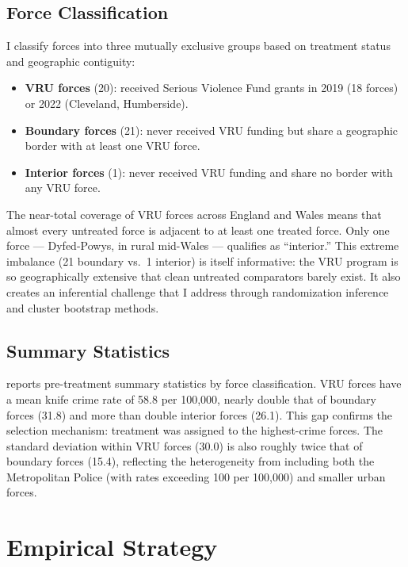\documentclass[12pt]{article}
\begin{document}
\subsection{Force Classification}

I classify forces into three mutually exclusive groups based on treatment status and geographic contiguity:

\begin{itemize}
\item \textbf{VRU forces} (20): received Serious Violence Fund grants in 2019 (18 forces) or 2022 (Cleveland, Humberside).
\item \textbf{Boundary forces} (21): never received VRU funding but share a geographic border with at least one VRU force.
\item \textbf{Interior forces} (1): never received VRU funding and share no border with any VRU force.
\end{itemize}

The near-total coverage of VRU forces across England and Wales means that almost every untreated force is adjacent to at least one treated force. Only one force --- Dyfed-Powys, in rural mid-Wales --- qualifies as ``interior.'' This extreme imbalance (21 boundary vs.\ 1 interior) is itself informative: the VRU program is so geographically extensive that clean untreated comparators barely exist. It also creates an inferential challenge that I address through randomization inference and cluster bootstrap methods.

\subsection{Summary Statistics}

 reports pre-treatment summary statistics by force classification. VRU forces have a mean knife crime rate of 58.8 per 100,000, nearly double that of boundary forces (31.8) and more than double interior forces (26.1). This gap confirms the selection mechanism: treatment was assigned to the highest-crime forces. The standard deviation within VRU forces (30.0) is also roughly twice that of boundary forces (15.4), reflecting the heterogeneity from including both the Metropolitan Police (with rates exceeding 100 per 100,000) and smaller urban forces.




\section{Empirical Strategy}
\label{sec:strategy}
\end{document}
